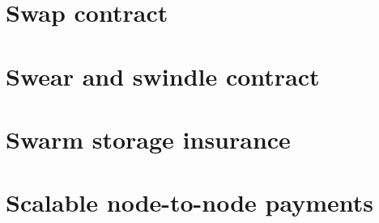 \documentclass[a4paper,10pt]{article}
\begin{document}

\appendix
\section{Swap contract}
\section{Swear and swindle contract}
\section{Swarm storage insurance}
\section{Scalable node-to-node payments}
\printglossary
\end{document}
